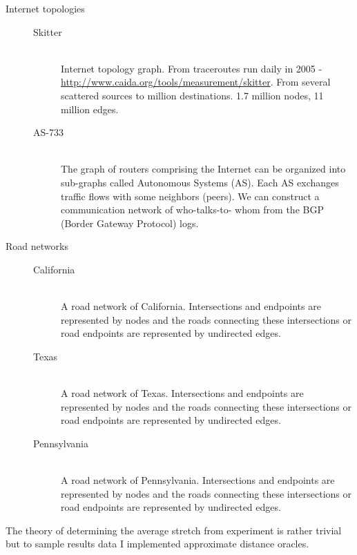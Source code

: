 \begin{description}
  \item[Internet topologies] \hfill
        \begin{description}
        \item[Skitter] \hfill \\
                Internet topology graph. From traceroutes run daily in 2005 -
                \url{http://www.caida.org/tools/measurement/skitter}. From several
                scattered sources to million destinations. 1.7 million nodes, 11
                million edges.

        \item[AS-733] \hfill \\
                The graph of routers comprising the Internet can be organized into
                sub-graphs called Autonomous Systems (AS). Each AS exchanges traffic flows
                with some neighbors (peers). We can construct a communication network of
                who-talks-to- whom from the BGP (Border Gateway Protocol) logs.
        \end{description}
  \item[Road networks] \hfill
        \begin{description}
        \item[California] \hfill \\
                A road network of California. Intersections and endpoints are represented
                by nodes and the roads connecting these intersections or road endpoints are
                represented by undirected edges.

        \item[Texas] \hfill \\
                A road network of Texas. Intersections and endpoints are represented
                by nodes and the roads connecting these intersections or road endpoints are
                represented by undirected edges.

        \item[Pennsylvania] \hfill \\
                A road network of Pennsylvania. Intersections and endpoints are represented
                by nodes and the roads connecting these intersections or road endpoints are
                represented by undirected edges.
    
        \end{description}
\end{description}

The theory of determining the average stretch from experiment is rather
trivial but to sample results data I implemented approximate distance oracles.
